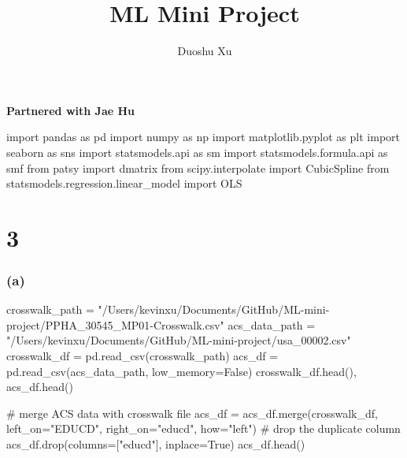 \documentclass[
  letterpaper,
  DIV=11,
  numbers=noendperiod]{scrartcl}
\title{ML Mini Project}
\author{Duoshu Xu}
\date{}
\newenvironment{Shaded}{\begin{snugshade}}{\end{snugshade}}
\newcommand{\CommentTok}[1]{\textcolor[rgb]{0.37,0.37,0.37}{#1}}
\newcommand{\ImportTok}[1]{\textcolor[rgb]{0.00,0.46,0.62}{#1}}
\newcommand{\NormalTok}[1]{\textcolor[rgb]{0.00,0.23,0.31}{#1}}
\newcommand{\OperatorTok}[1]{\textcolor[rgb]{0.37,0.37,0.37}{#1}}
\newcommand{\StringTok}[1]{\textcolor[rgb]{0.13,0.47,0.30}{#1}}
\newcommand{\VariableTok}[1]{\textcolor[rgb]{0.07,0.07,0.07}{#1}}
\begin{document}
\maketitle



\textbf{Partnered with Jae Hu}

\begin{Shaded}
\begin{Highlighting}[]
\ImportTok{import}\NormalTok{ pandas }\ImportTok{as}\NormalTok{ pd}
\ImportTok{import}\NormalTok{ numpy }\ImportTok{as}\NormalTok{ np}
\ImportTok{import}\NormalTok{ matplotlib.pyplot }\ImportTok{as}\NormalTok{ plt}
\ImportTok{import}\NormalTok{ seaborn }\ImportTok{as}\NormalTok{ sns}
\ImportTok{import}\NormalTok{ statsmodels.api }\ImportTok{as}\NormalTok{ sm}
\ImportTok{import}\NormalTok{ statsmodels.formula.api }\ImportTok{as}\NormalTok{ smf}
\ImportTok{from}\NormalTok{ patsy }\ImportTok{import}\NormalTok{ dmatrix}
\ImportTok{from}\NormalTok{ scipy.interpolate }\ImportTok{import}\NormalTok{ CubicSpline}
\ImportTok{from}\NormalTok{ statsmodels.regression.linear\_model }\ImportTok{import}\NormalTok{ OLS}
\end{Highlighting}
\end{Shaded}

\section{3}\label{section}

\subsubsection{(a)}\label{a}

\begin{Shaded}
\begin{Highlighting}[]
\NormalTok{crosswalk\_path }\OperatorTok{=} \StringTok{"/Users/kevinxu/Documents/GitHub/ML{-}mini{-}project/PPHA\_30545\_MP01{-}Crosswalk.csv"}
\NormalTok{acs\_data\_path }\OperatorTok{=} \StringTok{"/Users/kevinxu/Documents/GitHub/ML{-}mini{-}project/usa\_00002.csv"}
\NormalTok{crosswalk\_df }\OperatorTok{=}\NormalTok{ pd.read\_csv(crosswalk\_path)}
\NormalTok{acs\_df }\OperatorTok{=}\NormalTok{ pd.read\_csv(acs\_data\_path, low\_memory}\OperatorTok{=}\VariableTok{False}\NormalTok{)}
\NormalTok{crosswalk\_df.head(), acs\_df.head()}

\CommentTok{\# merge ACS data with crosswalk file}
\NormalTok{acs\_df }\OperatorTok{=}\NormalTok{ acs\_df.merge(crosswalk\_df, left\_on}\OperatorTok{=}\StringTok{"EDUCD"}\NormalTok{,}
\NormalTok{                      right\_on}\OperatorTok{=}\StringTok{"educd"}\NormalTok{, how}\OperatorTok{=}\StringTok{"left"}\NormalTok{)}
\CommentTok{\# drop the duplicate column}
\NormalTok{acs\_df.drop(columns}\OperatorTok{=}\NormalTok{[}\StringTok{"educd"}\NormalTok{], inplace}\OperatorTok{=}\VariableTok{True}\NormalTok{)}
\NormalTok{acs\_df.head()}
\end{Highlighting}
\end{Shaded}
\end{document}
